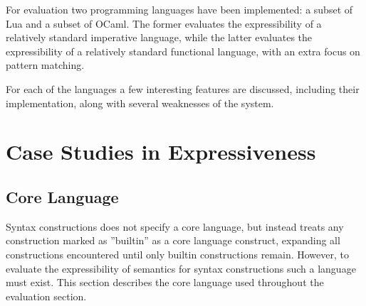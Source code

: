 \documentclass{kththesis}
\begin{document}
For evaluation two programming languages have been implemented: a subset of Lua and a subset of OCaml. The former evaluates the expressibility of a relatively standard imperative language, while the latter evaluates the expressibility of  a relatively standard functional language, with an extra focus on pattern matching.

For each of the languages a few interesting features are discussed, including their implementation, along with several weaknesses of the system.

\section{Case Studies in Expressiveness}

\subsection{Core Language} \label{sec:core-language}

Syntax constructions does not specify a core language, but instead treats any construction marked as ''builtin'' as a core language construct, expanding all constructions encountered until only builtin constructions remain. However, to evaluate the expressibility of semantics for syntax constructions such a language must exist. This section describes the core language used throughout the evaluation section.
\end{document}
